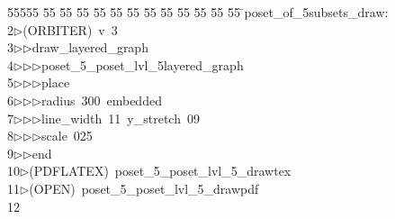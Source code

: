 %
%
\begin{tabbing}
55555 \= 55 \= 55 \= 55 \= 55 \= 55 \= 55 \= 55 \= 55 \= 55 \= 55 \= 55 \= 55 \= \>poset\_of\_5subsets\_draw:\\[0pt]
2\>$\triangleright$\>(ORBITER)\ v\ 3\ \\[0pt]
3\>$\triangleright$\>$\triangleright$\>draw\_layered\_graph\ \\[0pt]
4\>$\triangleright$\>$\triangleright$\>$\triangleright$\>poset\_5\_poset\_lvl\_5layered\_graph\ \\[0pt]
5\>$\triangleright$\>$\triangleright$\>$\triangleright$\>place\ \\[0pt]
6\>$\triangleright$\>$\triangleright$\>$\triangleright$\>radius\ 300\ embedded\ \\[0pt]
7\>$\triangleright$\>$\triangleright$\>$\triangleright$\>line\_width\ 11\ y\_stretch\ 09\ \\[0pt]
8\>$\triangleright$\>$\triangleright$\>$\triangleright$\>scale\ 025\ \\[0pt]
9\>$\triangleright$\>$\triangleright$\>end\\[0pt]
10\>$\triangleright$\>(PDFLATEX)\ poset\_5\_poset\_lvl\_5\_drawtex\\[0pt]
11\>$\triangleright$\>(OPEN)\ poset\_5\_poset\_lvl\_5\_drawpdf\\[0pt]
12\>\end{tabbing}
